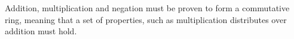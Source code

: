 \begin{AgdaMultiCode}
\begin{code}[hide]
\AgdaSpace{}%
\AgdaSymbol{\{}\AgdaSpace{}%
\AgdaSymbol{=}\AgdaSpace{}%
\AgdaSymbol{\}}\AgdaSpace{}%
\<%
\\
\>[0]\<%
\\
%
\>[4]\<%
\end{code}
Addition, multiplication and negation must be proven to form a commutative ring,
meaning that a set of properties, such as multiplication distributes over addition
must hold. \cite{CommRingTheory}
\begin{code}%
\>[4][@{}l@{\AgdaIndent{1}}]%
\>[6]\<%
\\
%
\>[6]\AgdaSpace{}%
\AgdaSymbol{:}\AgdaSpace{}%
\AgdaSpace{}%
\AgdaOperator{\AgdaField{\AgdaUnderscore{}+\AgdaUnderscore{}}}\AgdaSpace{}%
\AgdaOperator{\AgdaField{\AgdaUnderscore{}*\AgdaUnderscore{}}}\AgdaSpace{}%
\AgdaOperator{\AgdaField{-\AgdaUnderscore{}}}\AgdaSpace{}%
\AgdaSpace{}%
\<%
\\
%
\>[6]\<%
\end{code}

\end{AgdaMultiCode}
